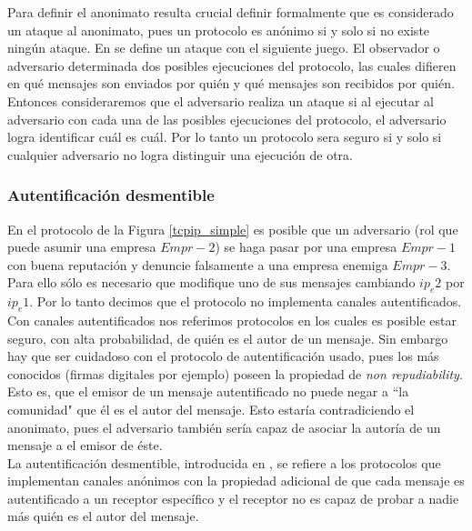 Para definir el anonimato resulta crucial definir formalmente que es considerado
un ataque al anonimato, pues un protocolo es anónimo si y solo si no existe ningún ataque.
En \cite{conf/pet/HeviaM08} se define un ataque con el siguiente juego.
El observador o adversario determinada dos posibles ejecuciones del protocolo, las cuales difieren en
qué mensajes son enviados por quién y qué mensajes son recibidos por quién. Entonces
consideraremos que el adversario realiza un ataque si al ejecutar al adversario con cada una
de las posibles ejecuciones del protocolo, el adversario logra identificar cuál es cuál.
Por lo tanto un protocolo sera seguro si y solo si cualquier adversario no logra distinguir
una ejecución de otra.

\subsubsection{Autentificación desmentible}
En el protocolo de la Figura \ref{tcpip_simple} es posible que un adversario (rol que puede
asumir una empresa $Empr-2$) se haga pasar por una empresa $Empr-1$ con buena reputación y denuncie
falsamente a una empresa enemiga $Empr-3$. Para ello
sólo es necesario que modifique uno de sus mensajes cambiando $ip_e2$ por $ip_e1$.
Por lo tanto decimos que el protocolo no implementa canales autentificados.\\
Con canales autentificados nos referimos protocolos en los cuales es posible estar seguro,
con alta probabilidad, de quién es el autor de un mensaje. Sin embargo hay que ser cuidadoso
con el protocolo de autentificación usado, pues los más conocidos
(firmas digitales por ejemplo) poseen la propiedad de \textit{non repudiability}. Esto es,
que el emisor de un mensaje autentificado no puede negar a ``la comunidad" que él es el autor
del mensaje. Esto estaría contradiciendo el anonimato, pues el adversario también sería capaz
de asociar la autoría de un mensaje a el emisor de éste.\\
La autentificación desmentible, introducida en \cite{DwoNaoSah04}, se refiere a los protocolos
que implementan canales anónimos con la propiedad adicional de que cada mensaje es autentificado
a un receptor específico y el receptor no es capaz de probar a nadie más quién es el autor del mensaje.

